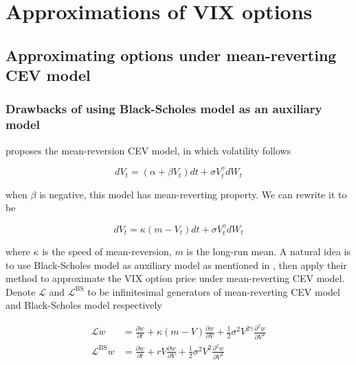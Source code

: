 \chapter{Approximations of VIX options}


\section{Approximating options under mean-reverting CEV model}
\label{sec: 3.1}

\subsection{Drawbacks of using Black-Scholes model as an auxiliary model}
\cite{chan_empirical_1992} proposes the mean-reversion CEV model, in which volatility follows

$$
    d V_{t}=\left(\alpha+\beta V_{t}\right) d t+\sigma V_{t}^{\gamma} d W_{t}
$$

\noindent when $\beta$ is negative, this model has mean-reverting property. We can rewrite it to be

\begin{equation}\label{mr}
    d V_t=\kappa(m - V_t) d t+\sigma V^{\gamma}_t d W_t
\end{equation}

\noindent where $\kappa$ is the speed of mean-reversion, $m$ is the long-run mean. A natural idea is to use Black-Scholes model as auxiliary model as mentioned in \cite{kristensen_adding_2011}, then apply their method to approximate the VIX option price under mean-reverting CEV model. Denote $\mathcal{L}$ and $\mathcal{L}^{\text{BS}}$ to be infinitesimal generators of mean-reverting CEV model and Black-Scholes model respectively

$$
\begin{aligned}
    \mathcal{L} w&= \frac{\partial w}{\partial t}+\kappa(m - V) \frac{\partial w}{\partial V}+\frac{1}{2} \sigma^{2} V^{2\gamma} \frac{\partial^{2} w}{\partial V^{2}} \\
    \mathcal{L}^{\text{BS}} w &= \frac{\partial w}{\partial t}+rV \frac{\partial w}{\partial V}+\frac{1}{2} \sigma^{2} V^2 \frac{\partial^{2} w}{\partial V^{2}}
\end{aligned}
$$

